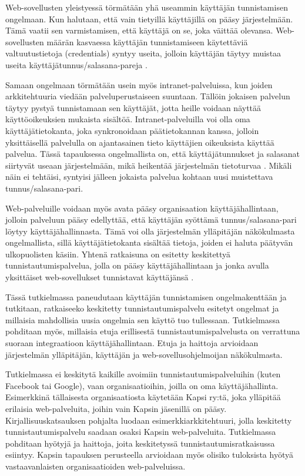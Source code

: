Web-sovellusten yleistyessä törmätään yhä useammin käyttäjän tunnistamisen ongelmaan. Kun halutaan, että vain tietyillä käyttäjillä on pääsy järjestelmään. Tämä vaatii sen varmistamisen, että käyttäjä on se, joka väittää olevansa. Web-sovellusten määrän kasvaessa käyttäjän tunnistamiseen käytettäviä valtuutustietoja (credentials) syntyy useita, jolloin käyttäjän täytyy muistaa useita käyttäjätunnus/salasana-pareja \cite{billion_keys}.

Samaan ongelmaan törmätään usein myös intranet-palveluissa, kun joiden arkkitehtuuria viedään palveluperustaiseen suuntaan. Tällöin jokaisen palvelun täytyy pystyä tunnistamaan sen käyttäjät, jotta heille voidaan näyttää käyttöoikeuksien mukaista sisältöä. Intranet-palveluilla voi olla oma käyttäjätietokanta, joka synkronoidaan päätietokannan kanssa, jolloin yksittäisellä palvelulla on ajantasainen tieto käyttäjien oikeuksista käyttää palvelua. Tässä tapauksessa ongelmallista on, että käyttäjätunnukset ja salasanat siirtyvät useaan järjestelmään, mikä heikentää järjestelmän tietoturvaa \cite{nisti}. Mikäli näin ei tehtäisi, syntyisi jälleen jokaista palvelua kohtaan uusi muistettava tunnus/salasana-pari.

Web-palveluille voidaan myös avata pääsy organisaation käyttäjähallintaan, jolloin palveluun pääsy edellyttää, että käyttäjän syöttämä tunnus/salasana-pari löytyy käyttäjähallinnasta. Tämä voi olla järjestelmän ylläpitäjän näkökulmasta ongelmallista, sillä käyttäjätietokanta sisältää tietoja, joiden ei haluta päätyvän ulkopuolisten käsiin. Yhtenä ratkaisuna on esitetty keskitettyä tunnistautumispalvelua, jolla on pääsy käyttäjähallintaan ja jonka avulla yksittäiset web-sovellukset tunnistavat käyttäjänsä \cite{nisti}.

Tässä tutkielmassa paneudutaan käyttäjän tunnistamisen ongelmakenttään ja tutkitaan, ratkaiseeko keskitetty tunnistautumispalvelu esitetyt ongelmat ja millaisia mahdollisia uusia ongelmia sen käyttö tuo tullessaan. Tutkielmassa pohditaan myös, millaisia etuja erillisestä tunnistautumispalvelusta on verrattuna suoraan integraatioon käyttäjähallintaan. Etuja ja haittoja arvioidaan järjestelmän ylläpitäjän, käyttäjän ja web-sovellusohjelmoijan näkökulmasta.

Tutkielmassa ei keskitytä kaikille avoimiin tunnistautumispalveluihin (kuten Facebook tai Google), vaan organisaatioihin, joilla on oma käyttäjähallinta. Esimerkkinä tällaisesta organisaatiosta käytetään Kapsi ry:tä, joka ylläpitää erilaisia web-palveluita, joihin vain Kapsin jäsenillä on pääsy. Kirjallisuuskatsauksen pohjalta luodaan esimerkkiarkkitehtuuri, jolla keskitetty tunnistautumispalvelu saadaan osaksi Kapsin web-palveluita. Tutkielmassa pohditaan hyötyjä ja haittoja, joita keskitetyssä tunnistautumisratkaisussa  esiintyy. Kapsin tapauksen perusteella arvioidaan myös olisiko tuloksista hyötyä vastaavanlaisten organisaatioiden web-palveluissa.

